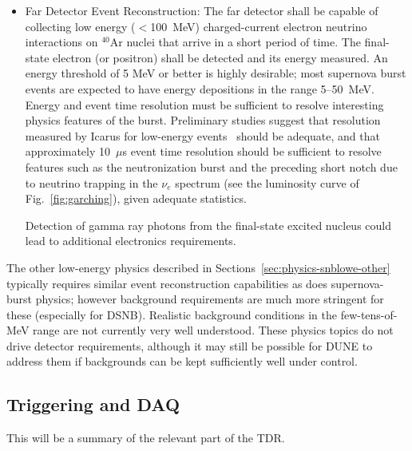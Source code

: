 \begin{itemize}
\item Far Detector Event Reconstruction:   
The far detector shall be capable of collecting low energy ($<$\SI{100}{\MeV})  charged-current electron neutrino interactions on $^{40}$Ar nuclei that arrive in a short period of time. The final-state electron (or positron) shall be detected and its energy measured.   An energy threshold of 5 MeV or better is highly desirable; most supernova burst events are expected to have energy depositions in the range 5--50~MeV.
Energy and event time resolution must be sufficient to resolve
interesting physics features of the burst.  Preliminary studies
suggest that resolution measured by Icarus for low-energy
events~\cite{Amoruso:2003sw} should be adequate, and that
approximately 10~$\mu$s event time resolution should be sufficient to resolve features such as the neutronization burst and the preceding short notch due to neutrino trapping in the $\nu_e$ spectrum (see the luminosity curve of Fig.~\ref{fig:garching}), given adequate statistics.   

Detection of gamma ray photons from the final-state excited nucleus could lead to additional electronics requirements.  

\end{itemize}



The other low-energy physics described in Sections~\ref{sec:physics-snblowe-other} typically requires similar event reconstruction capabilities as does supernova-burst physics; however background requirements are much more stringent for these (especially for DSNB).  Realistic background conditions in the few-tens-of-MeV range are not currently  very well understood.  
These physics topics do not drive detector requirements, although it may still be possible for DUNE to address them if backgrounds can be kept sufficiently well under control.




\subsection{Triggering and DAQ}

This will be a summary of the relevant part of the TDR.


